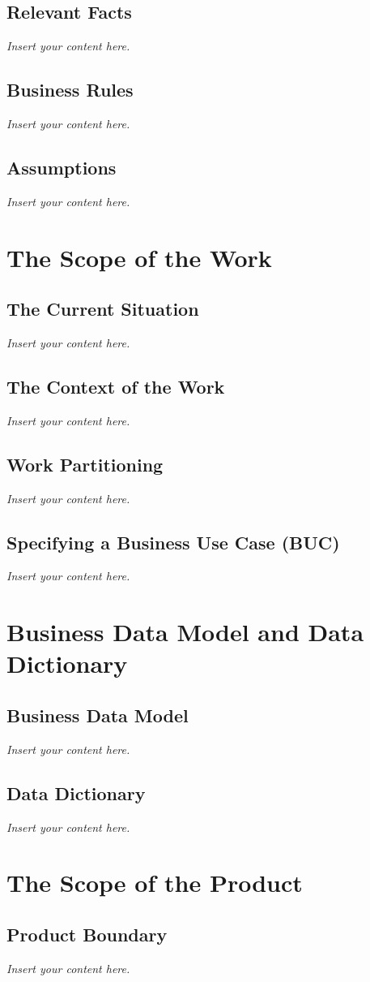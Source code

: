 \documentclass[12pt]{article}
\newcommand{\lips}{\textit{Insert your content here.}}
\begin{document}
\subsection{Relevant Facts}
\lips
\subsection{Business Rules}
\lips
\subsection{Assumptions}
\lips

\section{The Scope of the Work}
\subsection{The Current Situation}
\lips
\subsection{The Context of the Work}
\lips
\subsection{Work Partitioning}
\lips
\subsection{Specifying a Business Use Case (BUC)}
\lips

\section{Business Data Model and Data Dictionary}
\subsection{Business Data Model}
\lips
\subsection{Data Dictionary}
\lips

\section{The Scope of the Product}
\subsection{Product Boundary}
\lips
\end{document}

